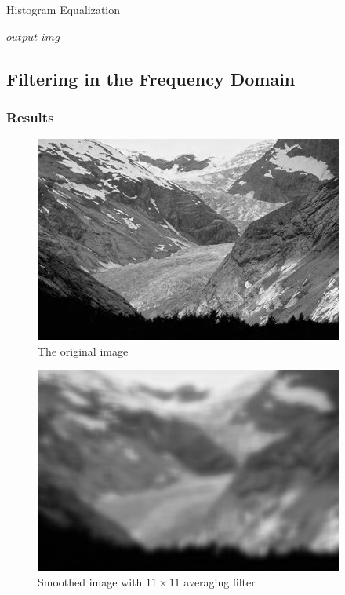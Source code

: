 \documentclass{article}
\begin{document}
\begin{algorithm}[H]
\centering
\caption{Histogram Equalization}
  \begin{algorithmic}[1]
      \State \Return $output\_img$
    \EndFunction
  \end{algorithmic}
\end{algorithm}

\subsection{Filtering in the Frequency Domain}

\subsubsection{Results}

\begin{figure}[H]
	\centering
	\includegraphics[width=288pt]{../img/02.png}
	\caption{The original image}
\end{figure}

\begin{figure}[H]
	\centering
	\includegraphics[width=288pt]{../result/average-11-11.png}
	\caption{Smoothed image with $11 \times 11$ averaging filter}
\end{figure}
\end{document}
